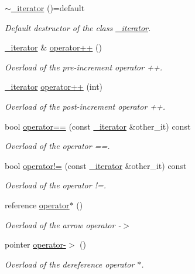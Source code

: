 \begin{DoxyCompactItemize}
\mbox{\label{classbst_1_1__iterator_a7481f64723caf6b9cf090acbdcda5af4}} 
\hyperlink{classbst_1_1__iterator_a7481f64723caf6b9cf090acbdcda5af4}{$\sim$\+\_\+iterator} ()=default
\begin{DoxyCompactList}\small\item\em Default destructor of the class \hyperlink{classbst_1_1__iterator}{\+\_\+iterator}. \end{DoxyCompactList}\item 
\hyperlink{classbst_1_1__iterator}{\+\_\+iterator} \& \hyperlink{classbst_1_1__iterator_a37378dada06d3ceb1f802ab7288cd4ce}{operator++} ()
\begin{DoxyCompactList}\small\item\em Overload of the pre-\/increment operator ++. \end{DoxyCompactList}\item 
\hyperlink{classbst_1_1__iterator}{\+\_\+iterator} \hyperlink{classbst_1_1__iterator_a8f721fc01d751f322216b7f67ac0a4df}{operator++} (int)
\begin{DoxyCompactList}\small\item\em Overload of the post-\/increment operator ++. \end{DoxyCompactList}\item 
bool \hyperlink{classbst_1_1__iterator_a2faf29cee0b7d5e2ce002b5c9ae4070b}{operator==} (const \hyperlink{classbst_1_1__iterator}{\+\_\+iterator} \&other\+\_\+it) const
\begin{DoxyCompactList}\small\item\em Overload of the operator ==. \end{DoxyCompactList}\item 
bool \hyperlink{classbst_1_1__iterator_a686ce4f61f2b00e175e68c0946f3343b}{operator!=} (const \hyperlink{classbst_1_1__iterator}{\+\_\+iterator} \&other\+\_\+it) const
\begin{DoxyCompactList}\small\item\em Overload of the operator !=. \end{DoxyCompactList}\item 
reference \hyperlink{classbst_1_1__iterator_a2c9b9c771a694c86fa380a461cde102d}{operator$\ast$} ()
\begin{DoxyCompactList}\small\item\em Overload of the arrow operator -\/$>$ \end{DoxyCompactList}\item 
pointer \hyperlink{classbst_1_1__iterator_ab0600ef918d7840c080a7dab0e43d8cd}{operator-\/$>$} ()
\begin{DoxyCompactList}\small\item\em Overload of the dereference operator $\ast$. \end{DoxyCompactList}\end{DoxyCompactItemize}
